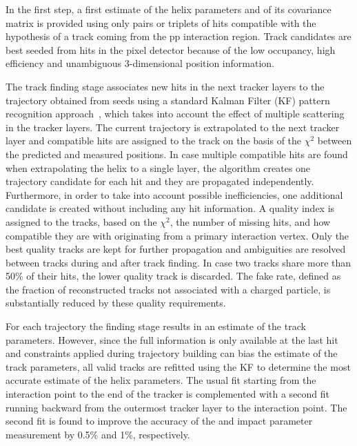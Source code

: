 In the first step, a first estimate of the helix parameters and of its covariance matrix is provided using only pairs or triplets of hits compatible with the hypothesis of a track coming from the pp interaction region. Track candidates are best seeded from hits in the pixel detector because of the low occupancy, high efficiency and unambiguous 3-dimensional position information.

The track finding stage associates new hits in the next tracker layers to the trajectory obtained from seeds using a standard Kalman Filter (KF) pattern recognition approach~\cite{Billoir:1989mh,Fruhwirth:1987fm}, which takes into account the effect of multiple scattering in the tracker layers. The current trajectory is extrapolated to the next tracker layer and compatible hits are assigned to the track on the basis of the $\chi^2$ between the predicted and measured positions. In case multiple compatible hits are found when extrapolating the helix to a single layer, the algorithm creates one trajectory candidate for each hit and they are propagated independently. Furthermore, in order to take into account possible inefficiencies, one additional candidate is created without including any hit information. A quality index is assigned to the tracks, based on the $\chi^2$, the number of missing hits, and how compatible they are with originating from a primary interaction vertex. Only the best quality tracks are kept for further propagation and ambiguities are resolved between tracks during and after track finding. In case two tracks share more than 50\% of their hits, the lower quality track is discarded. The fake rate, defined as the fraction of reconstructed tracks not associated with a charged particle, is substantially reduced by these quality requirements.

For each trajectory the finding stage results in an estimate of the track parameters. However, since the full information is only available at the last hit and constraints applied during trajectory building can bias the estimate of the track parameters, all valid tracks are refitted using the KF to determine the most accurate estimate of the helix parameters. The usual fit starting from the interaction point to the end of the tracker is complemented with a second fit running backward from the outermost tracker layer to the interaction point. The second fit is found to improve the accuracy of the \pt and impact parameter measurement by 0.5\% and 1\%, respectively.\\

